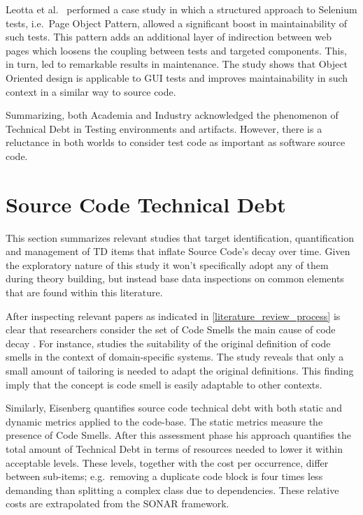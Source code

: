 Leotta et al.\ \cite{pageObjectPattern} performed a case study in which a structured approach to Selenium tests, i.e.\ Page Object Pattern, allowed a significant boost in maintainability of such tests. This pattern adds an additional layer of indirection between web pages which loosens the coupling between tests and targeted components. This, in turn, led to remarkable results in maintenance. The study shows that Object Oriented design is applicable to GUI tests and improves maintainability in such context in a similar way to source code.

Summarizing, both Academia and Industry acknowledged the phenomenon of Technical Debt in Testing environments and artifacts. However, there is a reluctance in both worlds to consider test code as important as software source code.

\section{Source Code Technical Debt} \label{source_code_technical_debt}

This section summarizes relevant studies that target identification, quantification and management of TD items that inflate Source Code's decay over time. Given the exploratory nature of this study it won't specifically adopt any of them during theory building, but instead base data inspections on common elements that are found within this literature.

After inspecting relevant papers as indicated in \ref{literature_review_process} is clear that researchers consider the set of Code Smells \cite{code_smell_definition} the main cause of code decay \cite{mapping_study_td}. For instance, \cite{domain_specific_code_smells} studies the suitability of the original definition of code smells in the context of domain-specific systems. The study reveals that only a small amount of tailoring is needed to adapt the original definitions. This finding imply that the concept is code smell is easily adaptable to other contexts. 

Similarly, Eisenberg \cite{threshold_approach_to_td} quantifies source code technical debt with both static and dynamic metrics applied to the code-base. The static metrics measure the presence of Code Smells. After this assessment phase his approach quantifies the total amount of Technical Debt in terms of resources needed to lower it within acceptable levels. These levels, together with the cost per occurrence, differ between sub-items; e.g.\ removing a duplicate code block is four times less demanding than splitting a complex class due to dependencies. These relative costs are extrapolated from the SONAR \cite{sonar_evaluate_td} framework.

